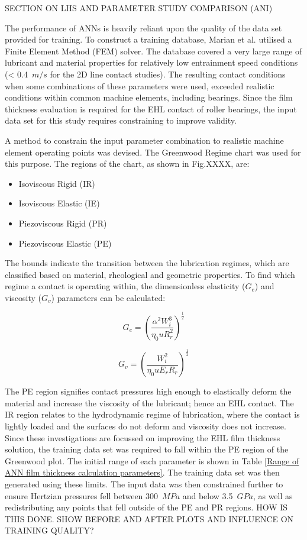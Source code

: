 SECTION ON LHS AND PARAMETER STUDY COMPARISON (ANI)

The performance of ANNs is heavily reliant upon the quality of the data set provided for training. To construct a training database, Marian et al. \cite{Marian2022} utilised a Finite Element Method (FEM) solver. The database covered a very large range of lubricant and material properties for relatively low entrainment speed conditions (< 0.4~$m/s$ for the 2D line contact studies). The resulting contact conditions when some combinations of these parameters were used, exceeded realistic conditions within common machine elements, including bearings. Since the film thickness evaluation is required for the EHL contact of roller bearings, the input data set for this study requires constraining to improve validity. 

A method to constrain the input parameter combination to realistic machine element operating points was devised. The Greenwood Regime chart \cite{Johnson1970} was used for this purpose. The regions of the chart, as shown in Fig.XXXX, are:

\begin{itemize}
	\item Isoviscous Rigid (IR)
	\item Isoviscous Elastic (IE)
	\item Piezoviscous Rigid (PR)
    \item Piezoviscous Elastic (PE)
\end{itemize}

The bounds indicate the transition between the lubrication regimes, which are classified based on material, rheological and geometric properties. To find which regime a contact is operating within, the dimensionless elasticity ($G_e$) and viscosity ($G_v$) parameters can be calculated:

\begin{equation}\label{G_e}
	G_e=\left(\frac{\alpha^2 W_i^3}{\eta_0 u R_r^2}\right)^{\frac{1}{2}}
\end{equation}

\begin{equation}\label{G_v}
	G_v=\left(\frac{W_i^2}{\eta_0 u E_r R_r}\right)^{\frac{1}{2}}
\end{equation}

The PE region signifies contact pressures high enough to elastically deform the material and increase the viscosity of the lubricant; hence an EHL contact. The IR region relates to the hydrodynamic regime of lubrication, where the contact is lightly loaded and the surfaces do not deform and viscosity does not increase. Since these investigations are focussed on improving the EHL film thickness solution, the training data set was required to fall within the PE region of the Greenwood plot. The initial range of each parameter is shown in Table \ref{Range of ANN film thickness calculation parameters}. The training data set was then generated using these limits. The input data was then constrained further to ensure Hertzian pressures fell between 300~$MPa$ and below 3.5~$GPa$, as well as redistributing any points that fell outside of the PE and PR regions. HOW IS THIS DONE. SHOW BEFORE AND AFTER PLOTS AND INFLUENCE ON TRAINING QUALITY?


